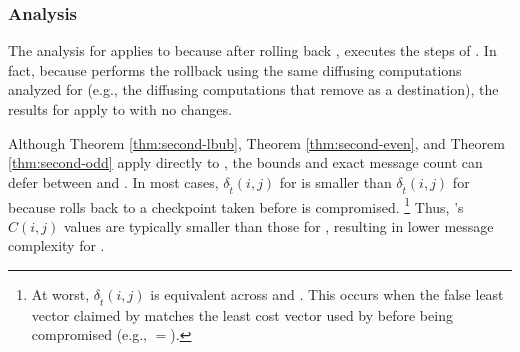 {{%



\subsubsection{\cpr Analysis}
\label{subsubsec:cpr-analysis}

The analysis for \second applies to \cpr because after rolling back \cprs, executes the steps of \seconds.  In fact, because \cpr performs the rollback 
using the same diffusing computations analyzed for \second (e.g., the diffusing
computations that remove \bad as a destination), the results for \second apply to \cpr with no changes. %

Although Theorem \ref{thm:second-lbub}, Theorem \ref{thm:second-even}, and Theorem \ref{thm:second-odd} apply directly to \cprs, the bounds and exact message count can defer 
between \second and \cprs. 
In most cases,  $\delta_{\hat{t}}(i,j)$ for \second is smaller than $\delta_{\hat{t}}(i,j)$ for \cpr because \cpr rolls back to a checkpoint taken before \bad is compromised. 
{\footnote {\small At worst, $\delta_{\hat{t}}(i,j)$ is equivalent across \second and \cprs.  This occurs when the false least vector claimed by \bad matches the least cost
vector used by \bad before being compromised (e.g., \badvectors$=$\oldvectors). }}
Thus, \cprs's $C(i,j)$ values are typically smaller than those for \seconds, resulting in lower message complexity for \cprs.

}}
